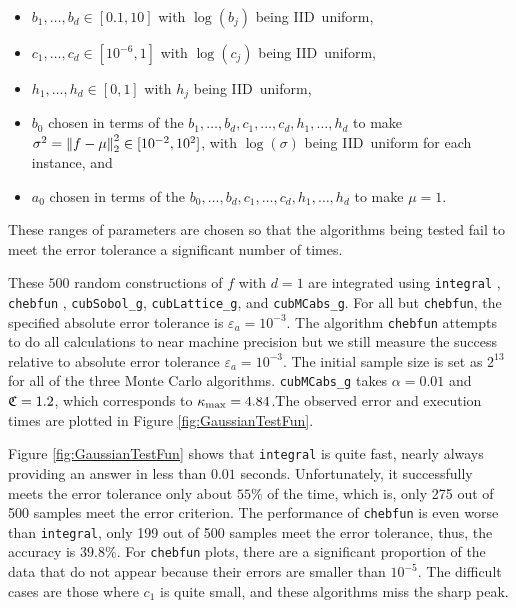 \documentclass{iitthesis}
\theoremstyle{definition}
\begin{document}
\begin{itemize} 
\item $b_1, \ldots, b_d \in [0.1,10]$ with $\log(b_j)$ being IID\ uniform,
\item $c_1, \ldots, c_d \in [10^{-6},1]$ with $\log(c_j)$ being IID\ uniform,
\item $h_1, \ldots, h_d \in [0,1]$ with $h_j$ being IID\ uniform,
\item $b_0$ chosen in terms of the $b_1, \ldots, b_d, c_1, \ldots, c_d, h_1, \ldots, h_d$ to make $\sigma^2 =\norm[2]{f-\mu}^2 \in [10^{-2}, 10^2]$, with $\log(\sigma)$ being IID\ uniform for each instance, and
\item $a_0$ chosen in terms of the $b_0, \ldots, b_d, c_1, \ldots, c_d, h_1, \ldots, h_d$ to make $\mu=1$.
\end{itemize}
These ranges of parameters are chosen so that the algorithms being tested fail to meet the error tolerance a significant number of times.

These $500$ random constructions of $f$ with $d=1$ are integrated using {\tt integral} \cite{Shampone08}, {\tt chebfun} \cite{Chebfun14}, {\tt cubSobol\_g}, {\tt cubLattice\_g}, and {\tt cubMCabs\_g}. For all but {\tt chebfun}, the specified absolute error tolerance is $\varepsilon_a=10^{-3}$. The algorithm {\tt chebfun} attempts to do all calculations to near machine precision but we still measure the success relative to absolute error tolerance $\varepsilon_a=10^{-3}$. The initial sample size is set as $2^{13}$ for all of the three Monte Carlo algorithms. {\tt cubMCabs\_g} takes $\alpha=0.01$ and $\fudge = 1.2$, which corresponds to $\kmax =4.84$.The observed error and execution times are plotted in Figure \ref{fig:GaussianTestFun}.  

Figure \ref{fig:GaussianTestFun} shows that {\tt integral} is quite fast, nearly always providing an answer in less than $0.01$ seconds.  Unfortunately, it successfully meets the error tolerance only about $55\%$ of the time, which is, only 275 out of 500 samples meet the error criterion. The performance of {\tt chebfun} is even worse than {\tt integral}, only 199 out of 500 samples meet the error tolerance, thus, the accuracy is $39.8\%$. For {\tt chebfun} plots, there are a significant proportion of the data that do not appear because their errors are smaller than $10^{-5}$.  The difficult cases are those where $c_1$ is quite small, and these algorithms miss the sharp peak.
%
\end{document}
